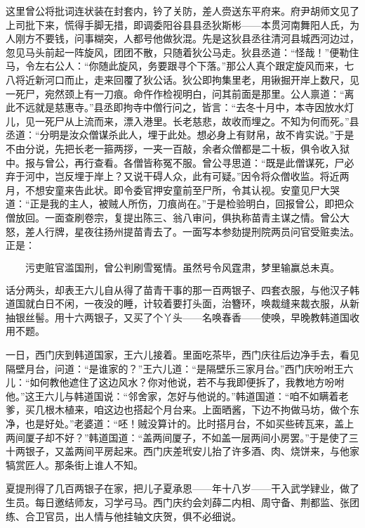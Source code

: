 这里曾公将批词连状装在封套内，钤了关防，差人赍送东平府来。府尹胡师文见了上司批下来，慌得手脚无措，即调委阳谷县县丞狄斯彬——本贯河南舞阳人氏，为人刚方不要钱，问事糊突，人都号他做狄混。先是这狄县丞往清河县城西河边过，忽见马头前起一阵旋风，团团不散，只随着狄公马走。狄县丞道：“怪哉！”便勒住马，令左右公人：“你随此旋风，务要跟寻个下落。”那公人真个跟定旋风而来，七八将近新河口而止，走来回覆了狄公话。狄公即拘集里老，用锹掘开岸上数尺，见一死尸，宛然颈上有一刀痕。命仵作检视明白，问其前面是那里。公人禀道：“离此不远就是慈惠寺。”县丞即拘寺中僧行问之，皆言：“去冬十月中，本寺因放水灯儿，见一死尸从上流而来，漂入港里。长老慈悲，故收而埋之。不知为何而死。”县丞道：“分明是汝众僧谋杀此人，埋于此处。想必身上有财帛，故不肯实说。”于是不由分说，先把长老一箍两拶，一夹一百敲，余者众僧都是二十板，俱令收入狱中。报与曾公，再行查看。各僧皆称冤不服。曾公寻思道：“既是此僧谋死，尸必弃于河中，岂反埋于岸上？又说干碍人众，此有可疑。”因令将众僧收监。将近两月，不想安童来告此状。即令委官押安童前至尸所，令其认视。安童见尸大哭道：“正是我的主人，被贼人所伤，刀痕尚在。”于是检验明白，回报曾公，即把众僧放回。一面查刷卷宗，复提出陈三、翁八审问，俱执称苗青主谋之情。曾公大怒，差人行牌，星夜往扬州提苗青去了。一面写本参劾提刑院两员问官受赃卖法。正是：

\[
污吏赃官滥国刑，曾公判刷雪冤情。
虽然号令风霆肃，梦里输赢总未真。
\]

话分两头，却表王六儿自从得了苗青干事的那一百两银子、四套衣服，与他汉子韩道国就白日不闲，一夜没的睡，计较着要打头面，治簪环，唤裁缝来裁衣服，从新抽银丝髻。用十六两银子，又买了个丫头——名唤春香——使唤，早晚教韩道国收用不题。

一日，西门庆到韩道国家，王六儿接着。里面吃茶毕，西门庆往后边净手去，看见隔壁月台，问道：“是谁家的？”王六儿道：“是隔壁乐三家月台。”西门庆吩咐王六儿：“如何教他遮住了这边风水？你对他说，若不与我即便拆了，我教地方吩咐他。”这王六儿与韩道国说：“邻舍家，怎好与他说的。”韩道国道：“咱不如瞒着老爹，买几根木植来，咱这边也搭起个月台来。上面晒酱，下边不拘做马坊，做个东净，也是好处。”老婆道：“呸！贼没算计的。比时搭月台，不如买些砖瓦来，盖上两间厦子却不好？”韩道国道：“盖两间厦子，不如盖一层两间小房罢。”于是使了三十两银子，又盖两间平房起来。西门庆差玳安儿抬了许多酒、肉、烧饼来，与他家犒赏匠人。那条街上谁人不知。

夏提刑得了几百两银子在家，把儿子夏承恩——年十八岁——干入武学肄业，做了生员。每日邀结师友，习学弓马。西门庆约会刘薛二内相、周守备、荆都监、张团练、合卫官员，出人情与他挂轴文庆贺，俱不必细说。

